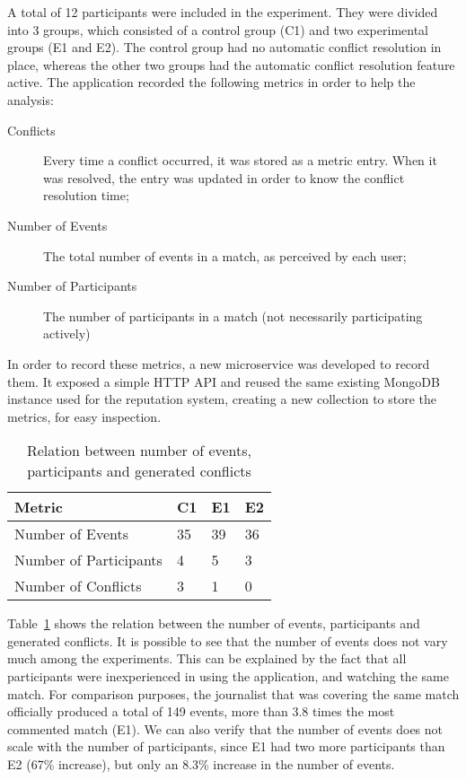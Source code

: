 A total of 12 participants were included in the experiment. They were divided into 3 groups, which consisted of a control group (C1) and two experimental groups (E1 and E2). The control group had no automatic conflict resolution in place, whereas the other two groups had the automatic conflict resolution feature active. The application recorded the following metrics in order to help the analysis:

\begin{description}
    \item[Conflicts] Every time a conflict occurred, it was stored as a metric entry. When it was resolved, the entry was updated in order to know the conflict resolution time;
    \item[Number of Events] The total number of events in a match, as perceived by each user;
    \item[Number of Participants] The number of participants in a match (not necessarily participating actively)
\end{description}

In order to record these metrics, a new microservice was developed to record them. It exposed a simple HTTP API and reused the same existing MongoDB instance used for the reputation system, creating a new collection to store the metrics, for easy inspection.

\begin{table}[h]
    \centering
    \caption{Relation between number of events, participants and generated conflicts}
    \begin{tabular}{|l|l|l|l|}
        \hline
        \textbf{Metric}        & \textbf{C1} & \textbf{E1} & \textbf{E2} \\ \hline
        Number of Events       & 35 & 39 & 36 \\ \hline
        Number of Participants & 4  & 5  & 3  \\ \hline
        Number of Conflicts\footnotemark    & 3  & 1  & 0  \\ \hline
    \end{tabular}
    \label{table:num-events-participants-conflicts}
\end{table}


Table~\ref{table:num-events-participants-conflicts} shows the relation between the number of events, participants and generated conflicts. It is possible to see that the number of events does not vary much among the experiments. This can be explained by the fact that all participants were inexperienced in using the application, and watching the same match. For comparison purposes, the journalist that was covering the same match officially produced a total of 149 events, more than 3.8 times the most commented match (E1). We can also verify that the number of events does not scale with the number of participants, since E1 had two more participants than E2 (67\% increase), but only an 8.3\% increase in the number of events.

